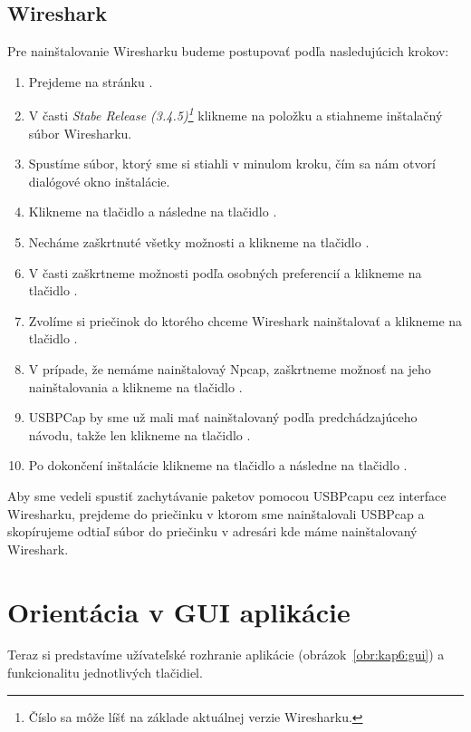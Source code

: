 \subsection{Wireshark}
Pre nainštalovanie Wiresharku budeme postupovať podľa nasledujúcich krokov:
\begin{enumerate}
\item Prejdeme na stránku .
\item V časti \textit{Stabe Release (3.4.5)\footnote{Číslo sa môže líšť na základe aktuálnej verzie Wiresharku.}} klikneme na položku  a stiahneme inštalačný súbor Wiresharku.
\item Spustíme súbor, ktorý sme si stiahli v minulom kroku, čím sa nám otvorí dialógové okno inštalácie.
\item Klikneme na tlačidlo  a následne na tlačidlo .
\item Necháme zaškrtnuté všetky možnosti a klikneme na tlačidlo .
\item V časti  zaškrtneme možnosti podľa osobných preferencií a klikneme na tlačidlo .
\item Zvolíme si priečinok do ktorého chceme Wireshark nainštalovať a klikneme na tlačidlo .
\item V prípade, že nemáme nainštalovaý Npcap, zaškrtneme možnosť na jeho nainštalovania a klikneme na tlačidlo .
\item USBPCap by sme už mali mať nainštalovaný podľa predchádzajúceho návodu, takže len klikneme na tlačidlo .
\item Po dokončení inštalácie klikneme na tlačidlo  a následne na tlačidlo .
\end{enumerate}

Aby sme vedeli spustiť zachytávanie paketov pomocou USBPcapu cez interface Wiresharku, prejdeme do priečinku v ktorom sme nainštalovali USBPcap a skopírujeme odtiaľ súbor  do priečinku  v adresári kde máme nainštalovaný Wireshark.



\section{Orientácia v GUI aplikácie}
Teraz si predstavíme užívateľské rozhranie aplikácie (obrázok~\ref{obr:kap6:gui}) a funkcionalitu jednotlivých tlačidiel. 

